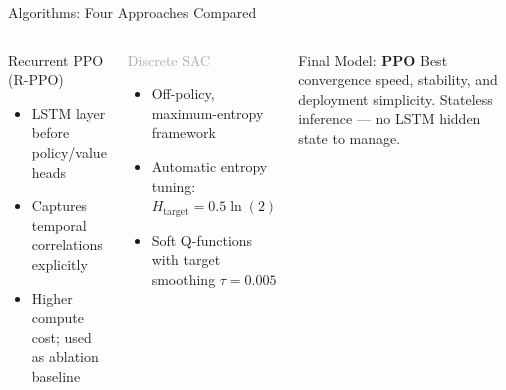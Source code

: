\documentclass[aspectratio=169]{beamer}
\begin{document}
\begin{frame}{Algorithms: Four Approaches Compared}
\begin{columns}[T]
      \begin{block}{\textcolor{greedyGreen}{Recurrent PPO (R-PPO)}}
        \begin{itemize}\itemsep2pt
          \item LSTM layer before policy/value heads
          \item Captures temporal correlations explicitly
          \item Higher compute cost; used as ablation baseline
        \end{itemize}
      \end{block}
      \vspace{4pt}
      \begin{block}{\textcolor{darkGray}{Discrete SAC}}
        \begin{itemize}\itemsep2pt
          \item Off-policy, maximum-entropy framework
          \item Automatic entropy tuning: $H_\text{target} = 0.5\ln(2)$
          \item Soft Q-functions with target smoothing $\tau=0.005$
        \end{itemize}
      \end{block}
      \vspace{6pt}
      \begin{alertblock}{Final Model: \textbf{PPO}}
        Best convergence speed, stability, and deployment simplicity.
        Stateless inference — no LSTM hidden state to manage.
      \end{alertblock}
  \end{columns}
\end{frame}
\end{document}
